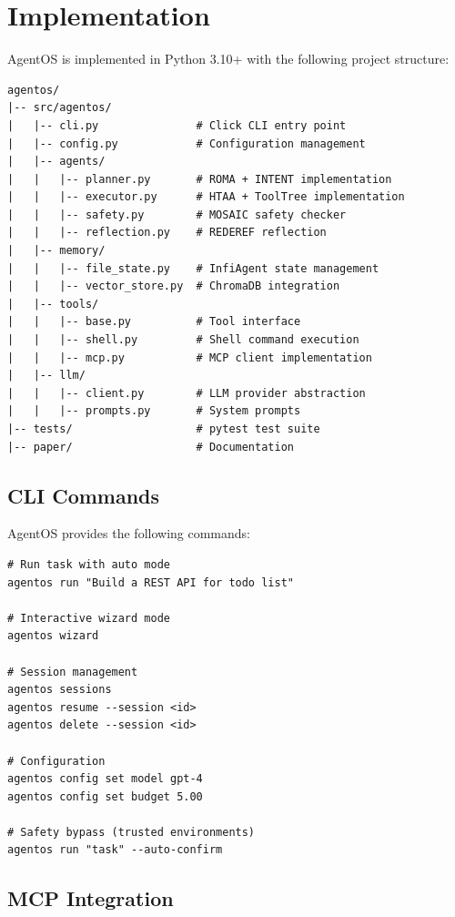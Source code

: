 \documentclass{article}
\begin{document}
\section{Implementation}

AgentOS is implemented in Python 3.10+ with the following project structure:

\begin{verbatim}
agentos/
|-- src/agentos/
|   |-- cli.py               # Click CLI entry point
|   |-- config.py            # Configuration management
|   |-- agents/
|   |   |-- planner.py       # ROMA + INTENT implementation
|   |   |-- executor.py      # HTAA + ToolTree implementation
|   |   |-- safety.py        # MOSAIC safety checker
|   |   |-- reflection.py    # REDEREF reflection
|   |-- memory/
|   |   |-- file_state.py    # InfiAgent state management
|   |   |-- vector_store.py  # ChromaDB integration
|   |-- tools/
|   |   |-- base.py          # Tool interface
|   |   |-- shell.py         # Shell command execution
|   |   |-- mcp.py           # MCP client implementation
|   |-- llm/
|   |   |-- client.py        # LLM provider abstraction
|   |   |-- prompts.py       # System prompts
|-- tests/                   # pytest test suite
|-- paper/                   # Documentation
\end{verbatim}

\subsection{CLI Commands}

AgentOS provides the following commands:

\begin{verbatim}
# Run task with auto mode
agentos run "Build a REST API for todo list"

# Interactive wizard mode
agentos wizard

# Session management
agentos sessions
agentos resume --session <id>
agentos delete --session <id>

# Configuration
agentos config set model gpt-4
agentos config set budget 5.00

# Safety bypass (trusted environments)
agentos run "task" --auto-confirm
\end{verbatim}

\subsection{MCP Integration}
\end{document}
